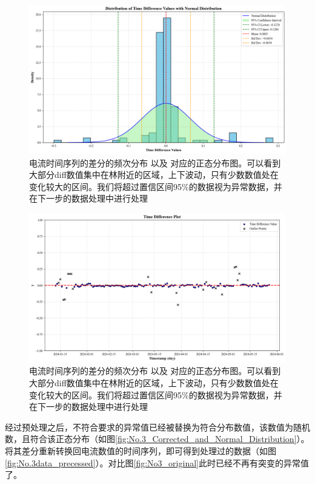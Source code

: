 \begin{figure}[H]
	\centering
	\includegraphics[width=\linewidth]{figures/No.3_Diff_and_Normal_Distribution} 
	\caption{电流时间序列的差分的频次分布 以及 对应的正态分布图。可以看到大部分diff数值集中在林附近的区域，上下波动，只有少数数值处在变化较大的区间。我们将超过置信区间95\%的数据视为异常数据，并在下一步的数据处理中进行处理}
	\label{fig:No.3_Diff_and_Normal_Distribution}
\end{figure}


\begin{figure}[H]
	\centering
	\includegraphics[width=\linewidth]{figures/No.3_Abnormal_Value} 
	\caption{电流时间序列的差分的频次分布 以及 对应的正态分布图。可以看到大部分diff数值集中在林附近的区域，上下波动，只有少数数值处在变化较大的区间。我们将超过置信区间95\%的数据视为异常数据，并在下一步的数据处理中进行处理}
	\label{fig:No.3_Abnormal_Value}
\end{figure}

经过预处理之后，不符合要求的异常值已经被替换为符合分布数值，该数值为随机数，且符合该正态分布（如图\ref{fig:No.3_Corrected_and_Normal_Distribution}）。将其差分重新转换回电流数值的时间序列，即可得到处理过的数据（如图\ref{fig:No.3data_precessed}）。对比图\ref{fig:No3_original}此时已经不再有突变的异常值了。

